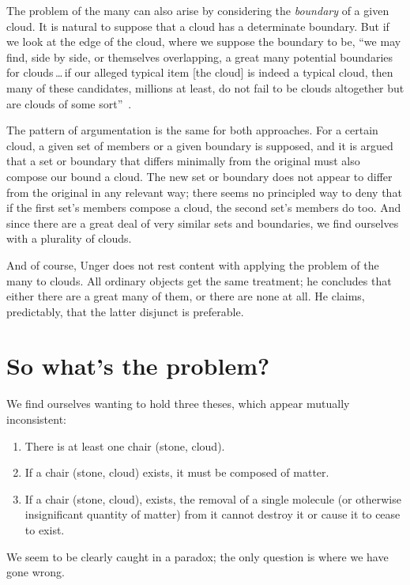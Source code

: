 \documentclass[11pt]{standalone} \newif\ifstandlone \standalonetrue
\begin{document}
\begin{spacing}{1.5}
The problem of the many can also arise by considering the {\em
  boundary} of a given cloud.  It is natural to suppose that a cloud
has a determinate boundary.  But if we look at the edge of the cloud,
where we suppose the boundary to be, ``we may find, side by side, or
themselves overlapping, a great many potential boundaries for
clouds\,\ldots\,if our alleged typical item {[}the cloud{]} is indeed
a typical cloud, then many of these candidates, millions at least, do
not fail to be clouds altogether but are clouds of some
sort''~\citep[420--421]{unger1980a}.

The pattern of argumentation is the same for both approaches.  For a
certain cloud, a given set of members or a given boundary is supposed,
and it is argued that a set or boundary that differs minimally from
the original must also compose our bound a cloud.  The new set or
boundary does not appear to differ from the original in any relevant
way; there seems no principled way to deny that if the first set's
members compose a cloud, the second set's members do too.  And since
there are a great deal of very similar sets and boundaries, we find
ourselves with a plurality of clouds.

And of course, Unger does not rest content with applying the problem
of the many to clouds.  All ordinary objects get the same treatment;
he concludes that either there are a great many of them, or there are
none at all.  He claims, predictably, that the latter disjunct is
preferable.

\section{So what's the problem?}
We find ourselves wanting to hold three theses, which appear mutually
inconsistent:

\begin{enumerate}
  \item There is at least one chair (stone, cloud).
  \item If a chair (stone, cloud) exists, it must be composed of
    matter.
  \item If a chair (stone, cloud), exists, the removal of a single
    molecule (or otherwise insignificant quantity of matter) from it
    cannot destroy it or cause it to cease to exist.
\end{enumerate}

We seem to be clearly caught in a paradox; the only question is where
we have gone wrong.


\end{spacing}
\end{document}
